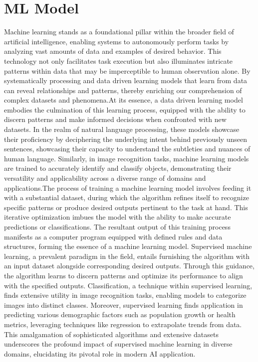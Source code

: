 \begin{description}
\end{description}
\pagebreak
\section{ML Model} 
Machine learning stands as a foundational pillar within the broader field of artificial intelligence, enabling systems to autonomously perform tasks by analyzing vast amounts of data and examples of desired behavior. This technology not only facilitates task execution but also illuminates intricate patterns within data that may be imperceptible to human observation alone. By systematically processing and data driven learning models that learn from data can reveal relationships and patterns, thereby enriching our comprehension of complex datasets and phenomena.At its essence, a data driven learning model embodies the culmination of this learning process, equipped with the ability to discern patterns and make informed decisions when confronted with new datasets. In the realm of natural language processing, these models showcase their proficiency by deciphering the underlying intent behind previously unseen sentences, showcasing their capacity to understand the subtleties and nuances of human language. Similarly, in image recognition tasks, machine learning models are trained to accurately identify and classify objects, demonstrating their versatility and applicability across a diverse range of domains and applications.The process of training a machine learning model involves feeding it with a substantial dataset, during which the algorithm refines itself to recognize specific patterns or produce desired outputs pertinent to the task at hand. This iterative optimization imbues the model with the ability to make accurate predictions or classifications. The resultant output of this training process manifests as a computer program equipped with defined rules and data structures, forming the essence of a machine learning model.
Supervised machine learning, a prevalent paradigm in the field, entails furnishing the algorithm with an input dataset alongside corresponding desired outputs. Through this guidance, the algorithm learns to discern patterns and optimize its performance to align with the specified outputs. Classification, a technique within supervised learning, finds extensive utility in image recognition tasks, enabling models to categorize images into distinct classes. Moreover, supervised learning finds application in predicting various demographic factors such as population growth or health metrics, leveraging techniques like regression to extrapolate trends from data. This amalgamation of sophisticated algorithms and extensive datasets underscores the profound impact of supervised machine learning in diverse domains, elucidating its pivotal role in modern AI application.
